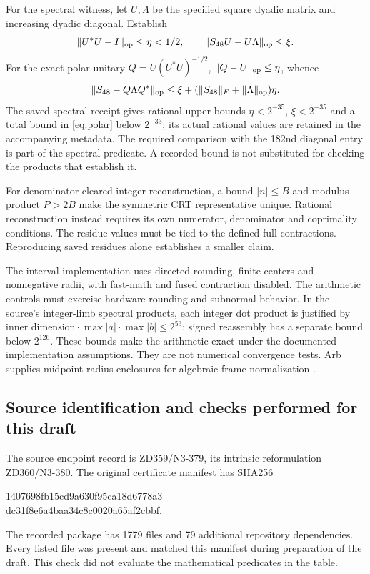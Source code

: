 \documentclass[11pt,a4paper]{article}
\theoremstyle{definition}\newtheorem{definition}[theorem]{Definition}
\theoremstyle{remark}\newtheorem{remark}[theorem]{Remark}
\numberwithin{equation}{section}
\begin{document}
For the spectral witness, let $U,\Lambda$ be the specified square
dyadic matrix and increasing dyadic diagonal. Establish
\[
\|U^*U-I\|_{\rm op}\le\eta<1/2,\qquad
\|S_{48}U-U\Lambda\|_{\rm op}\le\xi.
\]
For the exact polar unitary $Q=U(U^*U)^{-1/2}$,
$\|Q-U\|_{\rm op}\le\eta$, whence
\begin{equation}
\|S_{48}-Q\Lambda Q^*\|_{\rm op}
\le\xi+(\|S_{48}\|_F+\|\Lambda\|_{\rm op})\eta.
\label{eq:polar}
\end{equation}
The saved spectral receipt gives rational upper bounds
$\eta<2^{-35}$, $\xi<2^{-35}$ and a total bound in
\eqref{eq:polar} below $2^{-33}$; its actual rational values
are retained in the accompanying metadata.
The required comparison with the 182nd diagonal entry is part
of the spectral predicate. A recorded bound is not substituted
for checking the products that establish it.

For denominator-cleared integer reconstruction, a bound
$|n|\le B$ and modulus product $P>2B$ make the symmetric CRT
representative unique. Rational reconstruction instead requires
its own numerator, denominator and coprimality conditions.
The residue values must be tied to the defined full contractions.
Reproducing saved residues alone establishes a smaller claim.

The interval implementation uses directed rounding, finite centers
and nonnegative radii, with fast-math and fused contraction disabled.
The arithmetic controls must exercise hardware rounding and
subnormal behavior. In the source's integer-limb spectral products,
each integer dot product is justified by
$\text{inner dimension}\cdot\max|a|\cdot\max|b|\le2^{53}$;
signed reassembly has a separate bound below $2^{126}$.
These bounds make the arithmetic exact under the documented
implementation assumptions. They are not numerical convergence tests.
Arb supplies midpoint-radius enclosures for algebraic frame
normalization \cite{johansson}.

\subsection{Source identification and checks performed for this draft}
The source endpoint record is ZD359/N3-379, its intrinsic reformulation
ZD360/N3-380. The original certificate manifest has SHA256
\begin{center}\small\ttfamily
1407698fb15cd9a630f95ca18d6778a3\\
dc31f8e6a4baa34c8c0020a65af2cbbf.
\end{center}
The recorded package has 1779 files and 79 additional repository
dependencies. Every listed file was present and matched this manifest
during preparation of the draft. This check did not evaluate the
mathematical predicates in the table.
\end{document}
